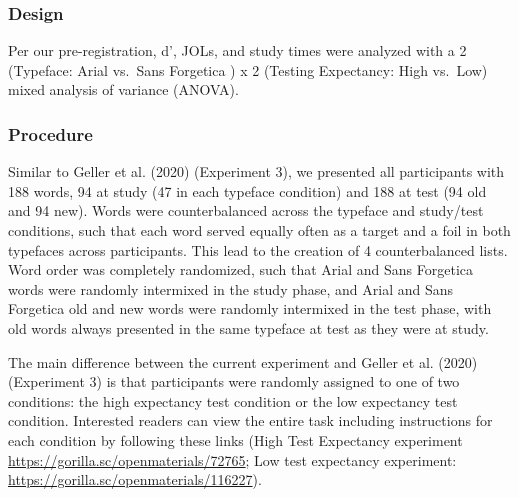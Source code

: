 \documentclass[
  english,
  man]{apa6}
\begin{document}
\hypertarget{design}{%
\subsubsection{Design}\label{design}}

Per our pre-registration, d', JOLs, and study times were analyzed with a 2 (Typeface: Arial vs.~Sans Forgetica ) x 2 (Testing Expectancy: High vs.~Low) mixed analysis of variance (ANOVA).

\hypertarget{procedure}{%
\subsubsection{Procedure}\label{procedure}}

Similar to Geller et al. (2020) (Experiment 3), we presented all participants with 188 words, 94 at study (47 in each typeface condition) and 188 at test (94 old and 94 new). Words were counterbalanced across the typeface and study/test conditions, such that each word served equally often as a target and a foil in both typefaces across participants. This lead to the creation of 4 counterbalanced lists. Word order was completely randomized, such that Arial and Sans Forgetica words were randomly intermixed in the study phase, and Arial and Sans Forgetica old and new words were randomly intermixed in the test phase, with old words always presented in the same typeface at test as they were at study.

The main difference between the current experiment and Geller et al. (2020) (Experiment 3) is that participants were randomly assigned to one of two conditions: the high expectancy test condition or the low expectancy test condition. Interested readers can view the entire task including instructions for each condition by following these links (High Test Expectancy experiment \url{https://gorilla.sc/openmaterials/72765}; Low test expectancy experiment: \url{https://gorilla.sc/openmaterials/116227}).
\end{document}
